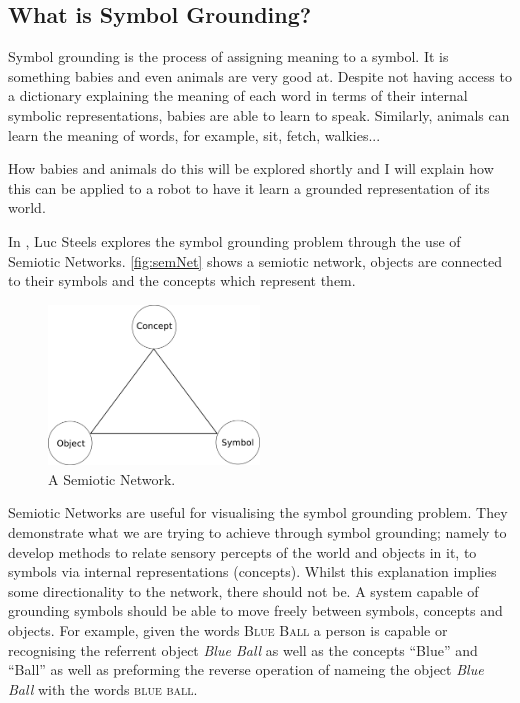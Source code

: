 \subsection{What is Symbol Grounding?}
Symbol grounding is the process of assigning meaning to a symbol. It is something babies and even animals are very good at. Despite not having access to a dictionary explaining the meaning of each word in terms of their internal symbolic representations, babies are able to learn to speak. Similarly, animals can learn the meaning of words, for example, sit, fetch, walkies...

How babies and animals do this will be explored shortly and I will explain how this can be applied to a robot to have it learn a grounded representation of its world.

In \cite{steels2008symbol}, Luc Steels explores the symbol grounding problem through the use of Semiotic Networks. \autoref{fig:semNet} shows a semiotic network, objects are connected to their symbols and the concepts which represent them.

\begin{figure}
\centering
\includegraphics[width=0.5\textwidth]{Figs/litReview/semioticNet.png}
\caption{A Semiotic Network.}
\label{fig:semNet}

\end{figure} 

Semiotic Networks are useful for visualising the symbol grounding problem. They demonstrate what we are trying to achieve through symbol grounding; namely to develop methods to relate sensory percepts of the world and objects in it, to symbols via internal representations (concepts). Whilst this explanation implies some directionality to the network, there should not be. A system capable of grounding symbols should be able to move freely between symbols, concepts and objects. For example, given the words \textsc{Blue Ball} a person is capable or recognising the referrent object  \textit{Blue Ball} as well as the concepts ``Blue'' and ``Ball'' as well as preforming the reverse operation of nameing the object \textit{Blue Ball} with the words \textsc{blue ball}.

